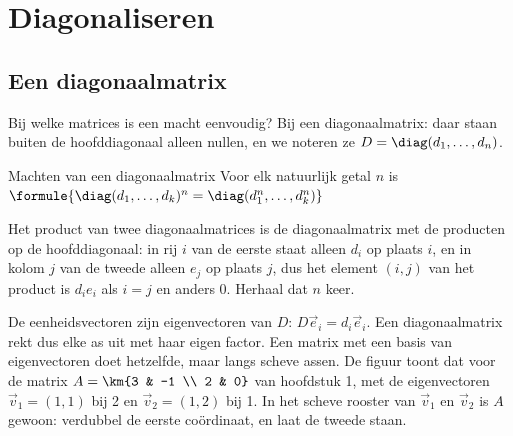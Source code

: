\begin{oefeningen}[Start]

\end{oefeningen}


\section{Diagonaliseren}

\subsection{Een diagonaalmatrix}

Bij welke matrices is een macht eenvoudig? Bij een diagonaalmatrix: daar staan buiten de hoofddiagonaal alleen nullen, en we noteren ze $D = \diag(d_1, \ldots, d_n)$.

\begin{theorie}
\begin{stelling}{Machten van een diagonaalmatrix}
Voor elk natuurlijk getal $n$ is \qquad $\formule{\diag(d_1, \ldots, d_k)^n = \diag(d_1^n, \ldots, d_k^n)}$
\end{stelling}

\begin{bewijs}
Het product van twee diagonaalmatrices is de diagonaalmatrix met de producten op de hoofddiagonaal: in rij $i$ van de eerste staat alleen $d_i$ op plaats $i$, en in kolom $j$ van de tweede alleen $e_j$ op plaats $j$, dus het element $(i, j)$ van het product is $d_ie_i$ als $i = j$ en anders 0. Herhaal dat $n$ keer.
\end{bewijs}
\end{theorie}

De eenheidsvectoren zijn eigenvectoren van $D$: $D\vec e_i = d_i\vec e_i$. Een diagonaalmatrix rekt dus elke as uit met haar eigen factor. Een matrix met een basis van eigenvectoren doet hetzelfde, maar langs scheve assen. De figuur toont dat voor de matrix $A = \km{3 & -1 \\ 2 & 0}$ van hoofdstuk 1, met de eigenvectoren $\vec v_1 = (1, 1)$ bij 2 en $\vec v_2 = (1, 2)$ bij 1. In het scheve rooster van $\vec v_1$ en $\vec v_2$ is $A$ gewoon: verdubbel de eerste coördinaat, en laat de tweede staan.

